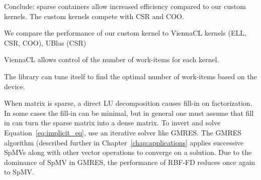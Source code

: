 \documentclass{report}
\begin{document}
Conclude: sparse containers allow increased efficiency compared to our custom kernels. The custom kernels compete with CSR and COO. 




We compare the performance of our custom kernel to ViennaCL kernels (ELL, CSR, COO), UBlas (CSR) 


ViennaCL allows control of the number of work-items for each kernel. 

The library can tune itself to find the optimal number of work-items based on the device. 





When matrix is sparse, a direct LU decomposition causes fill-in on factorization. In some cases the fill-in can be minimal, but in general one must assume that fill in can turn the sparse matrix into a dense matrix. To invert and solve Equation~\ref{eq:implicit_eq}, use an iterative solver like GMRES. The GMRES algorithm (described further in Chapter~\ref{chap:applications} applies successive SpMVs along with other vector operations to converge on a solution. Due to the dominance of SpMV in GMRES, the performance of RBF-FD reduces once again to SpMV.





%
%




\ifstandalone


\end{document}
